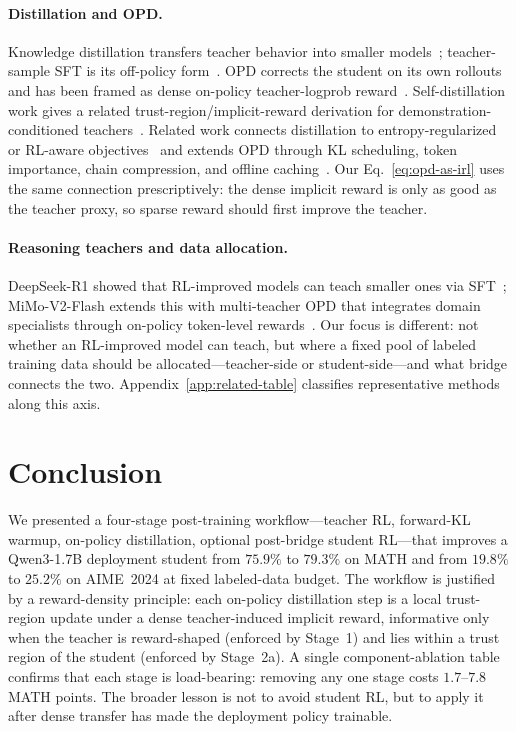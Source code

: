 \documentclass{article}
\begin{document}
\paragraph{Distillation and OPD.} Knowledge distillation transfers teacher behavior into smaller models~\citep{hinton2015distilling}; teacher-sample SFT is its off-policy form~\citep{deepseek2025r1}. OPD corrects the student on its own rollouts~\citep{agarwal2024onpolicy} and has been framed as dense on-policy teacher-logprob reward~\citep{lu2025onpolicydistillation}. Self-distillation work gives a related trust-region/implicit-reward derivation for demonstration-conditioned teachers~\citep{shenfeld2026selfdistillation}. Related work connects distillation to entropy-regularized or RL-aware objectives~\citep{liu2025trainingwheels,zhang2026reinforcementaware} and extends OPD through KL scheduling, token importance, chain compression, and offline caching~\citep{xu2026paced,xu2026tip,sang2026crisp,wu2026lightningopd}. Our Eq.~\ref{eq:opd-as-irl} uses the same connection prescriptively: the dense implicit reward is only as good as the teacher proxy, so sparse reward should first improve the teacher.

\paragraph{Reasoning teachers and data allocation.} DeepSeek-R1 showed that RL-improved models can teach smaller ones via SFT~\citep{deepseek2025r1}; MiMo-V2-Flash extends this with multi-teacher OPD that integrates domain specialists through on-policy token-level rewards~\citep{xiaomi2026mimov2flash}. Our focus is different: not whether an RL-improved model can teach, but where a fixed pool of labeled training data should be allocated---teacher-side or student-side---and what bridge connects the two. Appendix~\ref{app:related-table} classifies representative methods along this axis.

\section{Conclusion}

We presented a four-stage post-training workflow---teacher RL, forward-KL warmup, on-policy distillation, optional post-bridge student RL---that improves a Qwen3-1.7B deployment student from $75.9\%$ to $79.3\%$ on MATH and from $19.8\%$ to $25.2\%$ on AIME~2024 at fixed labeled-data budget. The workflow is justified by a reward-density principle: each on-policy distillation step is a local trust-region update under a dense teacher-induced implicit reward, informative only when the teacher is reward-shaped (enforced by Stage~1) and lies within a trust region of the student (enforced by Stage~2a). A single component-ablation table confirms that each stage is load-bearing: removing any one stage costs $1.7$--$7.8$ MATH points. The broader lesson is not to avoid student RL, but to apply it after dense transfer has made the deployment policy trainable.
\end{document}
